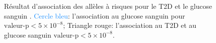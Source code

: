 \documentclass[11pt, a4paper]{article}
\begin{document}
\begin{figure}[ht]
    \begin{center}
    \end{center}
    \vspace{-15pt}
    \caption{Résultat d'association des allèles à risques pour le T2D et le glucose sanguin \citep{yaghootkar_recent_2013}.
    {\small \textcolor{dodgerblue}{Cercle bleu}: l'association au glucose sanguin pour $\textrm{valeur-p}<5\times 10^{-8}$;
    \textcolor{firebrick2}{Triangle rouge}: l'association au T2D et au glucose sanguin $\textrm{valeur-p}<5\times 10^{-8}$.}}
    \label{fig:gwas}
\end{figure}
\end{document}
